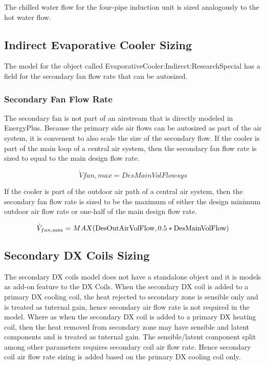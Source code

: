 The chilled water flow for the four-pipe induction unit is sized analogously to the hot water flow.

\subsection{Indirect Evaporative Cooler Sizing}\label{indirect-evaporative-cooler-sizing}

The model for the object called EvaporativeCooler:Indirect:ResearchSpecial has a field for the secondary fan flow rate that can be autosized.

\subsubsection{Secondary Fan Flow Rate}\label{secondary-fan-flow-rate}

The secondary fan is not part of an airstream that is directly modeled in EnergyPlus. Because the primary side air flows can be autosized as part of the air system, it is convenent to also scale the size of the secondary flow. If the cooler is part of the main loop of a central air system, then the secondary fan flow rate is sized to equal to the main design flow rate.

\begin{equation}
\dot Vfan,max = DesMainVolFlowsys
\end{equation}

If the cooler is part of the outdoor air path of a central air system, then the secondary fan flow rate is sized to be the maximum of either the design minimum outdoor air flow rate or one-half of the main design flow rate.

\begin{equation}
{\dot V_{fan,\max }} = MAX({\rm{DesOutAirVolFlow, 0}}{\rm{.5*DesMainVolFlow)}}
\end{equation}

\subsection{Secondary DX Coils Sizing}\label{secondary-dx-coils-sizing}

The secondary DX coils model does not have a standalone object and it is models as add-on feature to the DX Coils. When the secondary DX coil is added to a primary DX cooling coil, the heat rejected to secondary zone is sensible only and is treated as tnternal gain, hence secondary air flow rate is not required in the model. Where as when the secondary DX coil is added to a primary DX heating coil, then the heat removed from secondary zone may have sensible and latent components and is treated as tnternal gain. The sensible/latent component split among other parameters requires secondary coil air flow rate. Hence secondary coil air flow rate sizing is added based on the primary DX cooling coil only.

